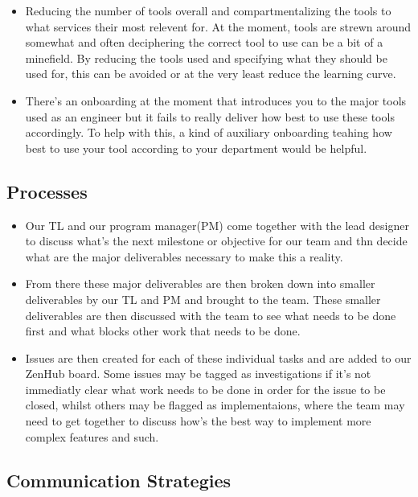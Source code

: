 \documentclass[11pt]{article} %
\begin{document}
\begin{itemize} 
\item Reducing the number of tools overall and compartmentalizing the tools to what services their most relevent for. At the moment, tools are strewn around somewhat and often deciphering the correct tool to use can be a bit of a minefield. By reducing the tools used and specifying what they should be used for, this can be avoided or at the very least reduce the learning curve. 
\item There's an onboarding at the moment that introduces you to the major tools used as an engineer but it fails to really deliver how best to use these tools accordingly. To help with this, a kind of auxiliary onboarding teahing how best to use your tool according to your department would be helpful.
\end{itemize}
\subsection{Processes}
 \begin{itemize}  
 \item Our TL and our program manager(PM) come together with the lead designer to discuss what's the next milestone or objective for our team and thn decide what are the major deliverables necessary to make this a reality. 
 \item From there these major deliverables are then broken down into smaller deliverables by our TL and PM and brought to the team. These smaller deliverables are then discussed with the team to see what needs to be done first and what blocks other work that needs to be done. 
 \item Issues are then created for each of these individual tasks and are added to our ZenHub board. Some issues may be tagged as investigations if it's not immediatly clear what work needs to be done in order for the issue to be closed, whilst others may be flagged as implementaions, where the team may need to get together to discuss how's the best way to implement more complex features and such.
\\ \end{itemize}
\subsection{Communication Strategies}
\end{document}
